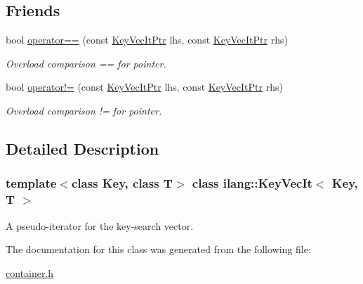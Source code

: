 \subsection*{Friends}
\begin{DoxyCompactItemize}
\item 
\mbox{\label{classilang_1_1_key_vec_it_aa913d8a3b6baf61513e9535e1bc80aca}} 
bool \mbox{\hyperlink{classilang_1_1_key_vec_it_aa913d8a3b6baf61513e9535e1bc80aca}{operator==}} (const \mbox{\hyperlink{classilang_1_1_key_vec_it_a357b858de2442e15b0613ac90f5214f1}{Key\+Vec\+It\+Ptr}} lhs, const \mbox{\hyperlink{classilang_1_1_key_vec_it_a357b858de2442e15b0613ac90f5214f1}{Key\+Vec\+It\+Ptr}} rhs)
\begin{DoxyCompactList}\small\item\em Overload comparison == for pointer. \end{DoxyCompactList}\item 
\mbox{\label{classilang_1_1_key_vec_it_a96e98a3bd2c578690729c4b23b2a84c5}} 
bool \mbox{\hyperlink{classilang_1_1_key_vec_it_a96e98a3bd2c578690729c4b23b2a84c5}{operator!=}} (const \mbox{\hyperlink{classilang_1_1_key_vec_it_a357b858de2442e15b0613ac90f5214f1}{Key\+Vec\+It\+Ptr}} lhs, const \mbox{\hyperlink{classilang_1_1_key_vec_it_a357b858de2442e15b0613ac90f5214f1}{Key\+Vec\+It\+Ptr}} rhs)
\begin{DoxyCompactList}\small\item\em Overload comparison != for pointer. \end{DoxyCompactList}\end{DoxyCompactItemize}


\subsection{Detailed Description}
\subsubsection*{template$<$class Key, class T$>$\newline
class ilang\+::\+Key\+Vec\+It$<$ Key, T $>$}

A pseudo-\/iterator for the key-\/search vector. 

The documentation for this class was generated from the following file\+:\begin{DoxyCompactItemize}
\item 
\mbox{\hyperlink{container_8h}{container.\+h}}\end{DoxyCompactItemize}
